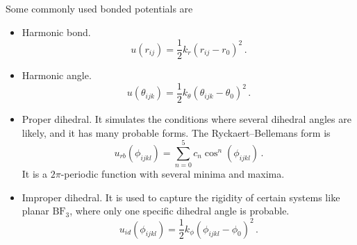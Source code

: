 \documentclass{article}
\theoremstyle{plain}\theoremheaderfont{\normalfont\itshape}\theorembodyfont{\rmfamily}\theoremseparator{.}\newtheorem*{rem}{Remark}\newtheorem*{ex}{Example}\newtheorem*{proof}{Proof}\newtheorem*{altp}{Alternative proof}
\theoremstyle{plain}\theoremheaderfont{\normalfont\bfseries}\theorembodyfont{\rmfamily}\theoremseparator{.}\newtheorem{thm}{Theorem}[section]\newtheorem{lem}[thm]{Lemma}\newtheorem{prop}[thm]{Proposition}\newtheorem*{cor}{Corollary}\newtheorem{defn}[thm]{Definition}\newtheorem{clm}[thm]{Claim}\newtheorem{clminproof}{Claim}\newtheorem{alg}[thm]{Algorithm}\newtheorem{hyp}[thm]{Hypothesis}\newtheorem{law}[thm]{Law}
\theoremstyle{break}\theoremheaderfont{\normalfont\itshape}\theorembodyfont{\rmfamily}\theoremseparator{.\medskip}\newtheorem*{proofskip}{Proof}\newtheorem*{exs}{Examples}\newtheorem*{rems}{Remarks}
\theoremstyle{break}\theoremheaderfont{\normalfont\bfseries}\theorembodyfont{\rmfamily}\theoremseparator{.\medskip}\newtheorem{lemskip}[thm]{Lemma}\newtheorem{defnskip}[thm]{Definition}\newtheorem{propskip}[thm]{Proposition}\newtheorem{thmskip}[thm]{Theorem}
\numberwithin{equation}{section}
\newcommand{\vb}[1]{\bm{\mathrm{#1}}}
\newcommand{\vdot}{\bm{\cdot}}
\newcommand{\norm}[1]{\left\| #1 \right\|}
\begin{document}
\begin{figure}[ht!]
    \end{figure}

    Some commonly used bonded potentials are
    \begin{itemize}[topsep=0pt]
        \item Harmonic bond.
        \begin{equation}
            u(r_{ij})=\frac{1}{2}k_r(r_{ij}-r_0)^2\,.
        \end{equation}
        \item Harmonic angle.
        \begin{equation}
            u(\theta_{ijk})=\frac{1}{2}k_\theta(\theta_{ijk}-\theta_0)^2\,.
        \end{equation}
        \item Proper dihedral. It simulates the conditions where several dihedral angles are likely, and it has many probable forms. The Ryckaert--Bellemans form is
        \begin{equation}
            u_{rb}(\phi_{ijkl})=\sum_{n=0}^{5}c_n\cos^n(\phi_{ijkl})\,.
        \end{equation}
        It is a \(2\pi\)-periodic function with several minima and maxima.
        \item Improper dihedral. It is used to capture the rigidity of certain systems like planar \(\mathrm{BF_3}\), where only one specific dihedral angle is probable.
        \begin{equation}
            u_{id}(\phi_{ijkl})=\frac{1}{2}k_\phi(\phi_{ijkl}-\phi_0)^2\,.
        \end{equation}
    \end{itemize}
\end{document}
